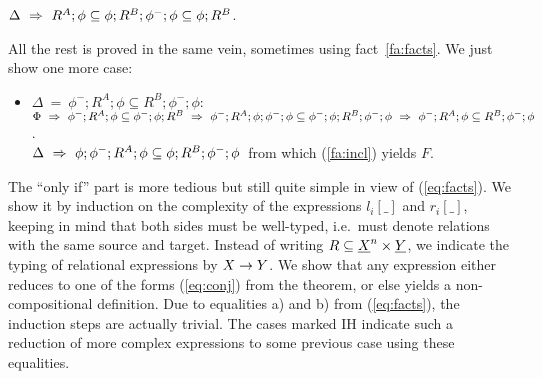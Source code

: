 \documentclass[10pt]{article}
\begin{document}
\begin{Proof}
\begin{enumerate}
$\Delta\ \impl\ R^A;\phi\subseteq\phi;R^B;\phi^-;\phi\subseteq\phi;R^B$.
\end{enumerate}
%
All the rest is proved in the same vein, sometimes using
fact~\ref{fa:facts}. We just show one more case:
\begin{itemize}\MyLPar
\item
$\Delta\ =\ \phi^-;R^A;\phi\subseteq R^B;\phi^-;\phi:$ \\
$\Phi\ \impl\ \phi^-;R^A;\phi\subseteq \phi^-;\phi;R^B\ 
    \impl\ \phi^-;R^A;\phi;\phi^-;\phi\subseteq\phi^-;\phi;R^B;\phi^-;\phi\
    \impl\ \phi^-;R^A;\phi\subseteq R^B;\phi^-;\phi$. \\
$\Delta\ \impl\ \phi;\phi^-;R^A;\phi\subseteq\phi;R^B;\phi^-;\phi$\ 
    from which (\ref{fa:incl}) yields $F$.
\end{itemize}\vspace*{-4ex}
\end{Proof}


\noindent
The ``only if'' part is more tedious but still quite simple in view of
(\ref{eq:facts}).  We show it by induction on the complexity of the
expressions $l_i[\_]$ and $r_i[\_]$, keeping in mind that both sides
must be well-typed, i.e.\ must denote relations with the same source
and target. Instead of writing $R\subseteq \underline {X}^n\times \underline {Y}$,
we indicate the typing of relational expressions by $X\rightarrow Y$.  We
show that any expression either reduces to one of the forms
(\ref{eq:conj}) from the theorem, or else yields a non-compositional
definition. Due to equalities a) and b) from (\ref{eq:facts}), the
induction steps are actually trivial. The cases marked IH indicate
such a reduction of more complex expressions to some previous case
using these equalities.
\end{document}
